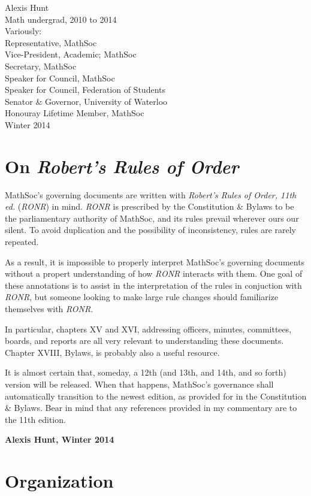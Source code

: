 Alexis Hunt\\
Math undergrad, 2010 to 2014\\
Variously:\\
\indent Representative, MathSoc\\
\indent Vice-President, Academic; MathSoc\\
\indent Secretary, MathSoc\\
\indent Speaker for Council, MathSoc\\
\indent Speaker for Council, Federation of Students\\
\indent Senator \& Governor, University of Waterloo\\
\indent Honouray Lifetime Member, MathSoc\\
Winter 2014

\section*{On \emph{Robert's Rules of Order}}

MathSoc's governing documents are written with \emph{Robert's Rules of Order,
11th ed.} (\emph{RONR}) in mind. \emph{RONR} is prescribed by the Constitution
\& Bylaws to be the parliamentary authority of MathSoc, and its rules prevail
wherever ours our silent. To avoid duplication and the possibility of
inconsistency, rules are rarely repeated.

As a result, it is impossible to properly interpret MathSoc's governing
documents without a propert understanding of how \emph{RONR} interacts
with them. One goal of these annotations is to assist in the interpretation of
the rules in conjuction with \emph{RONR}, but someone looking to make
large rule changes should familiarize themselves with \emph{RONR}.

In particular, chapters XV and XVI, addressing officers, minutes, committees,
boards, and reports are all very relevant to understanding these documents.
Chapter XVIII, Bylaws, is probably also a useful resource.

It is almost certain that, someday, a 12th (and 13th, and 14th, and so forth)
version will be released. When that happens, MathSoc's governance shall
automatically transition to the newest edition, as provided for in the
Constitution \& Bylaws. Bear in mind that any references provided in my
commentary are to the 11th edition.

\textbf{Alexis Hunt, Winter 2014}

\section*{Organization}

